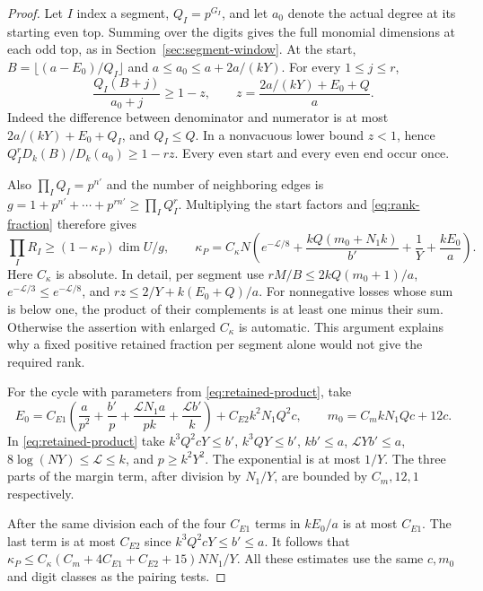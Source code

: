\begin{proof}

Let \(I\) index a segment, \(Q_I=p^{G_I}\), and let \(a_0\)
denote the actual degree at its starting even top. Summing
over the digits gives the full monomial dimensions at each
odd top, as in Section~\ref{sec:segment-window}. At the start,
\(B=\lfloor(a-E_0)/Q_I\rfloor\) and \(a\le a_0\le a+2a/(kY)\).
For every \(1\le j\le r\),
\[
 \frac{Q_I(B+j)}{a_0+j}\ge 1-z,\qquad
 z=\frac{2a/(kY)+E_0+Q}{a}.
\]
Indeed the difference between denominator and numerator
is at most \(2a/(kY)+E_0+Q_I\), and \(Q_I\le Q\).
In a nonvacuous lower bound \(z<1\), hence
\(Q_I^r D_k(B)/D_k(a_0)\ge1-rz\).
Every even start and every even end occur once.

Also
\(\prod_I Q_I=p^{n'}\) and the number of neighboring edges
is \(g=1+p^{n'}+\cdots+p^{rn'}\ge\prod_I Q_I^r\).
Multiplying the start factors and \eqref{eq:rank-fraction}
therefore gives
\begin{equation}\label{eq:retained-product}
 \prod_I R_I\ge(1-\kappa_P)\dim U/g,\qquad
 \kappa_P=C_\kappa N\left(e^{-\mathcal L/8}
   +\frac{kQ(m_0+N_1 k)}{b'}+\frac{1}{Y}+\frac{kE_0}{a}\right).
\end{equation}
Here \(C_\kappa\) is absolute. In detail, per segment use
\(rM/B\le2kQ(m_0+1)/a\), \(e^{-\mathcal L/3}\le
e^{-\mathcal L/8}\), and \(rz\le2/Y+k(E_0+Q)/a\).
For nonnegative losses whose sum is below one,
the product of their complements is at least one minus
their sum. Otherwise the assertion with enlarged
\(C_\kappa\) is automatic. This argument explains why a
fixed positive retained fraction per segment alone would
not give the required rank.

For the cycle with parameters from \eqref{eq:retained-product}, take
\[
 E_0=C_{E1}\left(\frac{a}{p^2}+\frac{b'}{p}
       +\frac{\mathcal L N_1a}{pk}+\frac{\mathcal L b'}{k}\right)
       +C_{E2}k^2N_1Q^2c,\qquad
 m_0=C_m kN_1Qc+12c.
\]
In \eqref{eq:retained-product} take \(k^3Q^2cY\le b'\),
\(k^3QY\le b'\), \(kb'\le a\), \(\mathcal L Y b'\le a\),
\(8\log(NY)\le\mathcal L\le k\), and \(p\ge k^2Y^2\).
The exponential is at most \(1/Y\). The three parts of the
margin term, after division by \(N_1/Y\), are bounded by
\(C_m,12,1\) respectively.

After the same division each of
the four \(C_{E1}\) terms in \(kE_0/a\) is at most \(C_{E1}\).
The last term is at most \(C_{E2}\) since \(k^3Q^2cY\le b'\le a\).
It follows that
\(\kappa_P\le C_\kappa(C_m+4C_{E1}+C_{E2}+15)NN_1/Y\).
  All these estimates use the
same \(c,m_0\) and digit classes as the pairing tests.
\end{proof}
